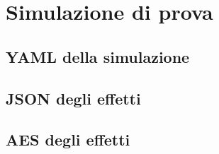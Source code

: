 
\appendix
    \chapter{Simulazione di prova}\label{app:test}
        \section{YAML della simulazione}\label{app:yaml}
            
            \clearpage

        \section{JSON degli effetti}\label{app:json}
            
            \clearpage

        \section{AES degli effetti}\label{app:aes}
            
            


